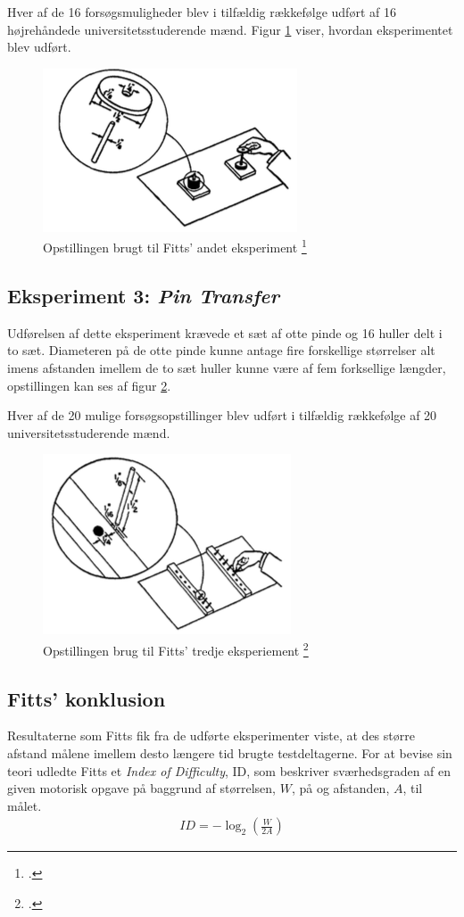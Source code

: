 Hver af de 16 forsøgsmuligheder blev i tilfældig rækkefølge udført af 16 højrehåndede universitetsstuderende mænd. Figur \ref{fig:FittsEx2} viser, hvordan eksperimentet blev udført.
\begin{figure}[h]
\centering
\includegraphics[scale=0.9]{billeder/FittsEx2.png}
\caption{Opstillingen brugt til Fitts' andet eksperiment \footcite{fitts1954}}
\label{fig:FittsEx2}
\end{figure}

\subsection*{Eksperiment 3: \textit{Pin Transfer}}
Udførelsen af dette eksperiment krævede et sæt af otte pinde og 16 huller delt i to sæt. Diameteren på de otte pinde kunne antage fire forskellige størrelser alt imens afstanden imellem de to sæt huller kunne være af fem forksellige længder, opstillingen kan ses af figur \ref{fig:FittsEx3}.

Hver af de 20 mulige forsøgsopstillinger blev udført i tilfældig rækkefølge af 20 universitetsstuderende mænd.
\begin{figure}[h]
\centering
\includegraphics[scale=0.9]{billeder/FittsEx3.png}
\caption{Opstillingen brug til Fitts' tredje eksperiement \footcite{fitts1954}}
\label{fig:FittsEx3}
\end{figure}

\subsection*{Fitts' konklusion}
Resultaterne som Fitts fik fra de udførte eksperimenter viste, at des større afstand målene imellem desto længere tid brugte testdeltagerne. For at bevise sin teori udledte Fitts et \textit{Index of Difficulty}, ID, som beskriver sværhedsgraden af en given motorisk opgave på baggrund af størrelsen, $W$, på og afstanden, $A$, til målet.
\begin{align*}
ID = -\log_2\left(\frac{W}{2A}\right)
\end{align*}


